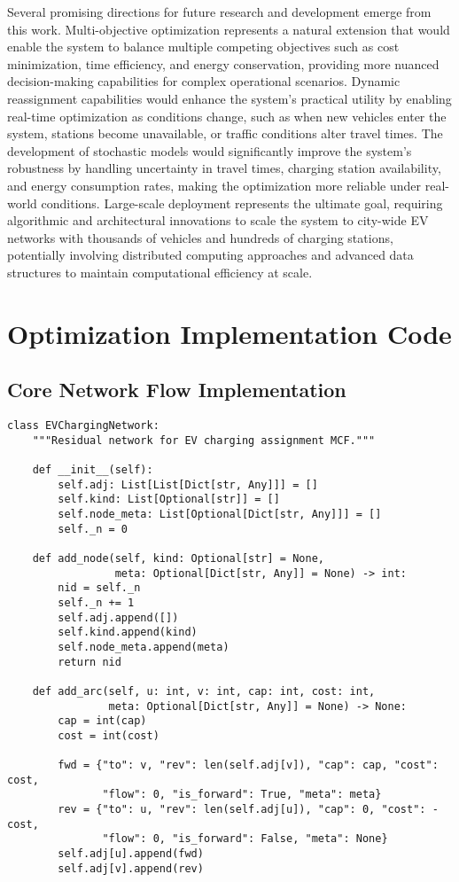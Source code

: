 \documentclass[12pt,a4paper]{article}
\begin{document}
Several promising directions for future research and development emerge from this work. Multi-objective optimization represents a natural extension that would enable the system to balance multiple competing objectives such as cost minimization, time efficiency, and energy conservation, providing more nuanced decision-making capabilities for complex operational scenarios. Dynamic reassignment capabilities would enhance the system's practical utility by enabling real-time optimization as conditions change, such as when new vehicles enter the system, stations become unavailable, or traffic conditions alter travel times. The development of stochastic models would significantly improve the system's robustness by handling uncertainty in travel times, charging station availability, and energy consumption rates, making the optimization more reliable under real-world conditions. Large-scale deployment represents the ultimate goal, requiring algorithmic and architectural innovations to scale the system to city-wide EV networks with thousands of vehicles and hundreds of charging stations, potentially involving distributed computing approaches and advanced data structures to maintain computational efficiency at scale.

\section{Optimization Implementation Code}

\subsection{Core Network Flow Implementation}

\begin{lstlisting}[caption=EVChargingNetwork Class]
class EVChargingNetwork:
    """Residual network for EV charging assignment MCF."""
    
    def __init__(self):
        self.adj: List[List[Dict[str, Any]]] = []
        self.kind: List[Optional[str]] = []
        self.node_meta: List[Optional[Dict[str, Any]]] = []
        self._n = 0

    def add_node(self, kind: Optional[str] = None, 
                 meta: Optional[Dict[str, Any]] = None) -> int:
        nid = self._n
        self._n += 1
        self.adj.append([])
        self.kind.append(kind)
        self.node_meta.append(meta)
        return nid

    def add_arc(self, u: int, v: int, cap: int, cost: int, 
                meta: Optional[Dict[str, Any]] = None) -> None:
        cap = int(cap)
        cost = int(cost)
        
        fwd = {"to": v, "rev": len(self.adj[v]), "cap": cap, "cost": cost,
               "flow": 0, "is_forward": True, "meta": meta}
        rev = {"to": u, "rev": len(self.adj[u]), "cap": 0, "cost": -cost,
               "flow": 0, "is_forward": False, "meta": None}
        self.adj[u].append(fwd)
        self.adj[v].append(rev)
\end{lstlisting}
\end{document}
